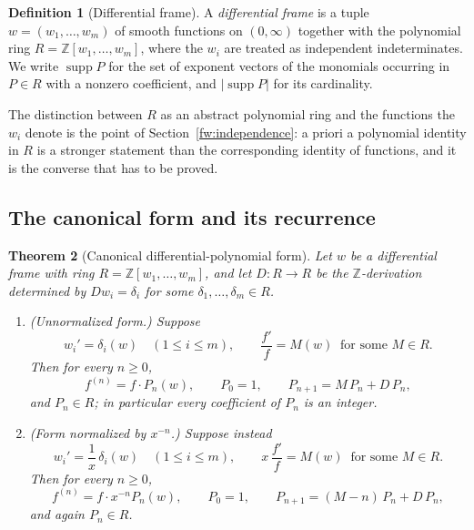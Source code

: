 \documentclass[11pt,a4paper]{article}
\numberwithin{equation}{section}
\newtheorem{theorem}{Theorem}[section]
\theoremstyle{definition}
\newtheorem{definition}[theorem]{Definition}
\theoremstyle{remark}
\theoremstyle{plain}
\DeclareMathOperator{\supp}{supp}
\newcommand{\Z}{\mathbb Z}
\begin{document}
\begin{definition}[Differential frame]\label{fw:def:frame}
A \emph{differential frame} is a tuple $w=(w_1,\dots,w_m)$ of smooth functions
on $(0,\infty)$ together with the polynomial ring $R=\Z[w_1,\dots,w_m]$, where
the $w_i$ are treated as independent indeterminates.  We write $\supp P$ for the
set of exponent vectors of the monomials occurring in $P\in R$ with a nonzero
coefficient, and $|\supp P|$ for its cardinality.
\end{definition}

The distinction between $R$ as an abstract polynomial ring and the functions the
$w_i$ denote is the point of Section~\ref{fw:independence}: a priori a
polynomial identity in $R$ is a stronger statement than the corresponding
identity of functions, and it is the converse that has to be proved.

\subsection{The canonical form and its recurrence}\label{fw:canonical}

\begin{theorem}[Canonical differential-polynomial form]\label{fw:thm:canonical}
Let $w$ be a differential frame with ring $R=\Z[w_1,\dots,w_m]$, and let
$D\colon R\to R$ be the $\Z$-derivation determined by $Dw_i=\delta_i$ for some
$\delta_1,\dots,\delta_m\in R$.
\begin{enumerate}[label=\textup{(\alph*)}]
\item\label{fw:can:a}
 \textup{(Unnormalized form.)}  Suppose
 \[
  w_i'=\delta_i(w)\quad(1\le i\le m),
  \qquad \frac{f'}{f}=M(w)\ \text{ for some }M\in R .
 \]
 Then for every $n\ge0$,
 \begin{equation}\label{fw:eq:cana}
  f^{(n)}=f\cdot P_n(w),\qquad
  P_0=1,\qquad P_{n+1}=M\,P_n+D\,P_n ,
 \end{equation}
 and $P_n\in R$; in particular every coefficient of $P_n$ is an integer.
\item\label{fw:can:b}
 \textup{(Form normalized by $x^{-n}$.)}  Suppose instead
 \[
  w_i'=\frac1x\,\delta_i(w)\quad(1\le i\le m),
  \qquad x\,\frac{f'}{f}=M(w)\ \text{ for some }M\in R .
 \]
 Then for every $n\ge0$,
 \begin{equation}\label{fw:eq:canb}
  f^{(n)}=f\cdot x^{-n}P_n(w),\qquad
  P_0=1,\qquad P_{n+1}=(M-n)\,P_n+D\,P_n ,
 \end{equation}
 and again $P_n\in R$.
\end{enumerate}
\end{theorem}
\end{document}

